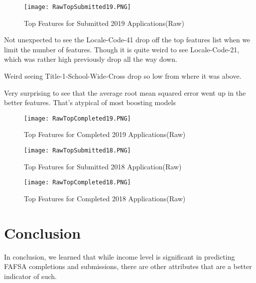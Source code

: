 \documentclass[12pt]{article}
\begin{document}
\begin{figure}[!htb]
  \centering
  \texttt{[image: RawTopSubmitted19.PNG]}
  \caption{Top Features for Submitted 2019 Applications(Raw)}
  \label{fig:feature_importance}
\end{figure}

Not unexpected to see the Locale-Code-41 drop off the top features list when we limit the number of features. Though it is quite weird to see Locale-Code-21, which was rather high previously drop all the way down.

Weird seeing Title-1-School-Wide-Cross drop so low from where it was above.

Very surprising to see that the average root mean squared error went up in the better features. That's atypical of most boosting models

\begin{figure}[!htb]
  \centering
  \texttt{[image: RawTopCompleted19.PNG]}
  \caption{Top Features for Completed 2019 Applications(Raw)}
  \label{fig:feature_importance}
\end{figure}

\begin{figure}[!htb]
  \centering
  \texttt{[image: RawTopSubmitted18.PNG]}
  \caption{Top Features for Submitted 2018 Application(Raw)}
  \label{fig:feature_importance}
\end{figure}

\begin{figure}[!htb]
  \centering
  \texttt{[image: RawTopCompleted18.PNG]}
  \caption{Top Features for Completed 2018 Applications(Raw)}
  \label{fig:feature_importance}
\end{figure}


\section{Conclusion}
In conclusion, we learned that while income level is significant in predicting FAFSA completions and submissions, there are other attributes that are a better indicator of such.

\printbibliography
%   


\end{document}

